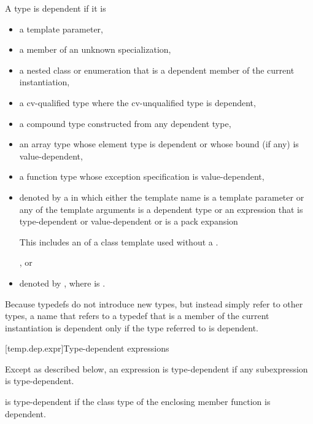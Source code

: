 \pnum
A type is dependent if it is
\begin{itemize}
\item
a template parameter,
\item
a member of an unknown specialization,
\item
a nested class or enumeration that is a dependent member of the current
instantiation,
\item
a cv-qualified type where the cv-unqualified type is dependent,
\item
a compound type constructed from any dependent type,
\item
an array type whose element type is dependent or whose
bound (if any) is value-dependent,
\item
a function type whose exception specification is value-dependent,
\item
denoted by a 
in which either the template name is a template parameter or any of the
template arguments is a dependent type or an expression that is type-dependent
or value-dependent or is a pack expansion
\begin{note}
This includes an  of a class template
used without a .
\end{note}%
, or
\item denoted by \tcode{)},
where  is .
\end{itemize}

\pnum
\begin{note}
Because typedefs do not introduce new types, but
instead simply refer to other types, a name that refers to a
typedef that is a member of the current instantiation is dependent
only if the type referred to is dependent.
\end{note}

[temp.dep.expr]{Type-dependent expressions}

\pnum
Except as described below, an expression is type-dependent if any
subexpression is type-dependent.

\pnum
{}
is type-dependent if the class type of the enclosing member function is
dependent.

